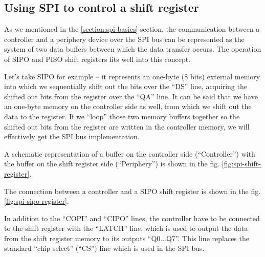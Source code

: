 \documentclass[../sparc.tex]{subfiles}
\begin{document}
\subsection{Using SPI to control a shift register}

As we mentioned in the \ref{section:spi-basics} section, the communication
between a controller and a periphery device over the \gls{SPI} bus can be
represented as the system of two data buffers between which the data transfer
occurs.  The operation of \gls{SIPO} and \gls{PISO} shift registers fits well
into this concept.

Let's take \gls{SIPO} for example -- it represents an one-byte (8 bits) external
memory into which we sequentially shift out the bits over the ``DS'' line,
acquiring the shifted out bits from the register over the ``QA'' line.  It can
be said that we have an one-byte memory on the controller side as well, from
which we shift out the data to the register.  If we ``loop'' those two memory
buffers together so the shifted out bits from the register are written in the
controller memory, we will effectively get the SPI bus implementation.


A schematic representation of a buffer on the controller side (``Controller'')
with the buffer on the shift register side (``Periphery'') is shown in the
fig. \ref{fig:spi-shift-register}.


The connection between a controller and a SIPO shift register is shown in the
fig. \ref{fig:spi-sipo-register}.

In addition to the ``COPI'' and ``CIPO'' lines, the controller have to be
connected to the shift register with the ``LATCH'' line, which is used to output
the data from the shift register memory to its outputs ``Q0...Q7''.  This line
replaces the standard ``chip select'' (``CS'') line which is used in the SPI
bus.
\end{document}
